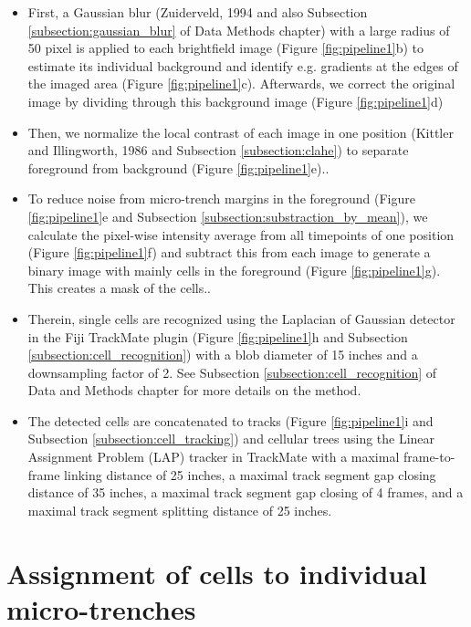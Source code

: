 \documentclass[pdftex,12pt,a4paper]{report}
\begin{document}
\begin{itemize}
\item First, a Gaussian blur (Zuiderveld, 1994 \cite{zuiderveld1994contrast} and also Subsection \ref{subsection:gaussian_blur} of Data Methods chapter) with a large radius of 50 pixel is applied to each brightfield image (Figure \ref{fig:pipeline1}b) to estimate its individual background and identify e.g. gradients at the edges of the imaged area (Figure \ref{fig:pipeline1}c). Afterwards, we correct the original image by dividing through this background image (Figure \ref{fig:pipeline1}d)

\item Then, we normalize the local contrast of each image in one position (Kittler and Illingworth, 1986 \cite{kittler1986minimum} and Subsection \ref{subsection:clahe}) to separate foreground from background (Figure \ref{fig:pipeline1}e)..

\item To reduce noise from micro-trench margins in the foreground (Figure \ref{fig:pipeline1}e and Subsection \ref{subsection:substraction_by_mean}), we calculate the pixel-wise intensity average from all timepoints of one position (Figure \ref{fig:pipeline1}f) and subtract this from each image to generate a binary image with mainly cells in the foreground (Figure \ref{fig:pipeline1}g). This creates a mask of the cells..

\item Therein, single cells are recognized using the Laplacian of Gaussian detector in the Fiji TrackMate plugin \cite{tinevez2017trackmate} (Figure \ref{fig:pipeline1}h and Subsection \ref{subsection:cell_recognition}) with a blob diameter of 15 inches and a downsampling factor of 2. See Subsection \ref{subsection:cell_recognition} of Data and Methods chapter for more details on the method.

\item The detected cells are concatenated to tracks (Figure \ref{fig:pipeline1}i and Subsection \ref{subsection:cell_tracking}) and cellular trees using the Linear Assignment Problem (LAP) tracker\cite{jaqaman2008robust} in TrackMate with a maximal frame-to-frame linking distance of 25 inches, a maximal track segment gap closing distance of 35 inches, a maximal track segment gap closing of 4 frames, and a maximal track segment splitting distance of 25 inches.
\end{itemize}

\section{Assignment of cells to individual micro-trenches}
\end{document}
